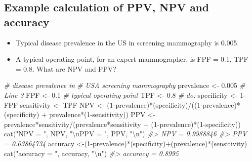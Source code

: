 \documentclass[
]{book}
\newenvironment{Shaded}{\begin{snugshade}}{\end{snugshade}}
\newcommand{\CommentTok}[1]{\textcolor[rgb]{0.56,0.35,0.01}{\textit{#1}}}
\newcommand{\DecValTok}[1]{\textcolor[rgb]{0.00,0.00,0.81}{#1}}
\newcommand{\FloatTok}[1]{\textcolor[rgb]{0.00,0.00,0.81}{#1}}
\newcommand{\FunctionTok}[1]{\textcolor[rgb]{0.00,0.00,0.00}{#1}}
\newcommand{\NormalTok}[1]{#1}
\newcommand{\OtherTok}[1]{\textcolor[rgb]{0.56,0.35,0.01}{#1}}
\newcommand{\SpecialCharTok}[1]{\textcolor[rgb]{0.00,0.00,0.00}{#1}}
\newcommand{\StringTok}[1]{\textcolor[rgb]{0.31,0.60,0.02}{#1}}
\providecommand{\tightlist}{%
  \setlength{\itemsep}{0pt}\setlength{\parskip}{0pt}}
\begin{document}
\hypertarget{binary-taskNpvPpvCode}{%
\subsection{Example calculation of PPV, NPV and accuracy}\label{binary-taskNpvPpvCode}}

\begin{itemize}
\tightlist
\item
  Typical disease prevalence in the US in screening mammography is 0.005.
\item
  A typical operating point, for an expert mammographer, is FPF = 0.1, TPF = 0.8. What are NPV and PPV?
\end{itemize}

\begin{Shaded}
\begin{Highlighting}[]
\CommentTok{\# disease prevalence in }
\CommentTok{\# USA screening mammography }
\NormalTok{prevalence }\OtherTok{\textless{}{-}} \FloatTok{0.005} \CommentTok{\# Line 3 }
\NormalTok{FPF }\OtherTok{\textless{}{-}} \FloatTok{0.1} \CommentTok{\# typical operating point }
\NormalTok{TPF }\OtherTok{\textless{}{-}} \FloatTok{0.8} \CommentTok{\#        do: }
\NormalTok{specificity }\OtherTok{\textless{}{-}} \DecValTok{1}\SpecialCharTok{{-}}\NormalTok{FPF }
\NormalTok{sensitivity }\OtherTok{\textless{}{-}}\NormalTok{ TPF }
\NormalTok{NPV }\OtherTok{\textless{}{-}}\NormalTok{ (}\DecValTok{1}\SpecialCharTok{{-}}\NormalTok{prevalence)}\SpecialCharTok{*}\NormalTok{(specificity)}\SpecialCharTok{/}\NormalTok{((}\DecValTok{1}\SpecialCharTok{{-}}\NormalTok{prevalence)}\SpecialCharTok{*}\NormalTok{(specificity) }\SpecialCharTok{+}\NormalTok{ prevalence}\SpecialCharTok{*}\NormalTok{(}\DecValTok{1}\SpecialCharTok{{-}}\NormalTok{sensitivity)) }
\NormalTok{PPV }\OtherTok{\textless{}{-}}\NormalTok{ prevalence}\SpecialCharTok{*}\NormalTok{sensitivity}\SpecialCharTok{/}\NormalTok{(prevalence}\SpecialCharTok{*}\NormalTok{sensitivity }\SpecialCharTok{+}\NormalTok{ (}\DecValTok{1}\SpecialCharTok{{-}}\NormalTok{prevalence)}\SpecialCharTok{*}\NormalTok{(}\DecValTok{1}\SpecialCharTok{{-}}\NormalTok{specificity)) }
\FunctionTok{cat}\NormalTok{(}\StringTok{"NPV = "}\NormalTok{, NPV, }\StringTok{"}\SpecialCharTok{\textbackslash{}n}\StringTok{PPV = "}\NormalTok{, PPV, }\StringTok{"}\SpecialCharTok{\textbackslash{}n}\StringTok{"}\NormalTok{)}
\CommentTok{\#\textgreater{} NPV =  0.9988846 }
\CommentTok{\#\textgreater{} PPV =  0.03864734}
\NormalTok{accuracy }\OtherTok{\textless{}{-}}\NormalTok{(}\DecValTok{1}\SpecialCharTok{{-}}\NormalTok{prevalence)}\SpecialCharTok{*}\NormalTok{(specificity)}\SpecialCharTok{+}\NormalTok{(prevalence)}\SpecialCharTok{*}\NormalTok{(sensitivity) }
\FunctionTok{cat}\NormalTok{(}\StringTok{"accuracy = "}\NormalTok{, accuracy, }\StringTok{"}\SpecialCharTok{\textbackslash{}n}\StringTok{"}\NormalTok{)}
\CommentTok{\#\textgreater{} accuracy =  0.8995}
\end{Highlighting}
\end{Shaded}
\end{document}
